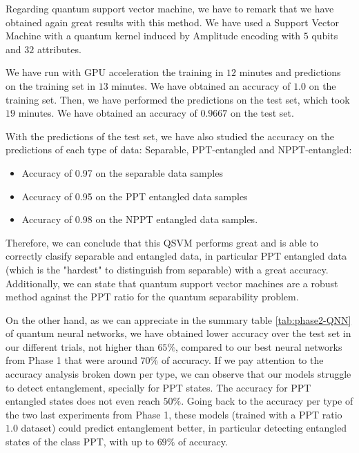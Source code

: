 Regarding quantum support vector machine, we have to remark that we have obtained again great results with this method. We have used a Support Vector Machine with a quantum kernel induced by Amplitude encoding with $5$ qubits and $32$ attributes.

We have run with GPU acceleration the training in $12$ minutes and predictions on the training set in $13$ minutes. We have obtained an accuracy of $1.0$ on the training set.
Then, we have performed the predictions on the test set, which took $19$ minutes. We have obtained an accuracy of $0.9667$ on the test set.

With the predictions of the test set, we have also studied the accuracy on the predictions of each type of data: Separable, PPT-entangled and NPPT-entangled:
\begin{itemize}
    \item Accuracy of 0.97 on the separable data samples
    \item Accuracy of 0.95 on the PPT entangled data samples
    \item Accuracy of 0.98 on the NPPT entangled data samples.
\end{itemize}

Therefore, we can conclude that this QSVM performs great and is able to correctly clasify separable and entangled data, in particular PPT entangled data (which is the "hardest" to distinguish from separable) with a great accuracy. Additionally, we can state that quantum support vector machines are a robust method against the PPT ratio for the quantum separability problem.

On the other hand, as we can appreciate in the summary table \autoref{tab:phase2-QNN} of quantum neural networks, we have obtained lower accuracy over the test set in our different trials, not higher than $65\%$, compared to our best neural networks from Phase 1 that were around $70\%$ of accuracy. If we pay attention to the accuracy analysis broken down per type, we can observe that our models struggle to detect entanglement, specially for PPT states. The accuracy for PPT entangled states does not even reach $50\%$. Going back to the accuracy per type of the two last experiments from Phase 1, these models (trained with a PPT ratio $1.0$ dataset) could predict entanglement better, in particular detecting entangled states of the class PPT, with up to $69\%$ of accuracy. 


